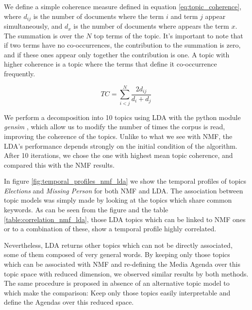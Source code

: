 \documentclass[a4paper, 12pt]{article}
\begin{document}
\par We define a simple coherence measure defined in equation \ref{eq:topic_coherence}, where $d_{ij}$ is the number of documents where the term $i$ and term $j$ appear simultaneously, and $d_{x}$ is the number of documents where appears the term $x$. The summation is over the $N$ top terms of the topic.
It's important to note that if two terms have no co-occurrences, the contribution to the summation is zero, and if these ones appear only together the contribution is one.
A topic with higher coherence is a topic where the terms that define it co-occurrence frequently.

\begin{equation}
TC = \sum_{i < j}^N \frac{2d_{ij}}{d_i + d_j}
\label{eq:topic_coherence} 
\end{equation}

\par We perform a decomposition into 10 topics using LDA with the python module \emph{gensim} \cite{rehurek_lrec}, which allow us to modify the number of times the corpus is read, improving the coherence of the topics.
Unlike to what we see with NMF, the LDA's performance depends strongly on the initial condition of the algorithm. After 10 iterations, we chose the one with highest mean topic coherence, and compared this with the NMF results.

\par In figure \ref{fig:temporal_profiles_nmf_lda} we show the temporal profiles of topics \emph{Elections} and \emph{Missing Person} for both NMF and LDA. The association between topic models was simply made by looking at the topics which share common keywords.
As can be seen from the figure and the table \ref{table:correlation_nmf_lda}, those LDA topics which can be linked to NMF ones or to a combination of these, show a temporal profile highly correlated. 

\par Nevertheless, LDA returns other topics which can not be directly associated, some of them composed of very general words. 
By keeping only those topics which can be associated with NMF and re-defining the Media Agenda over this topic space with reduced dimension, we observed similar results by both methods.  
The same procedure is proposed in absence of an alternative topic model to which make the comparison: Keep only those topics easily interpretable and define the Agendas over this reduced space.
 
\end{document}
